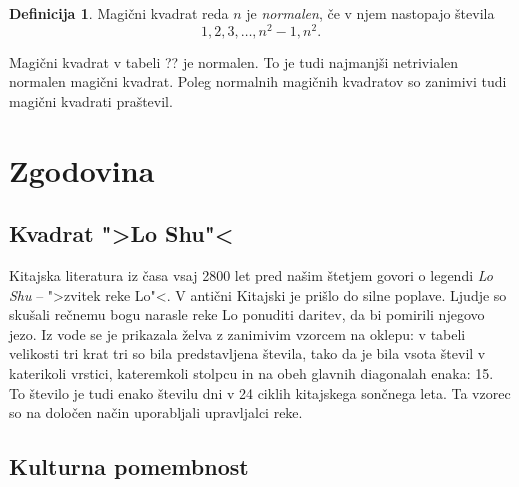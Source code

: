 \documentclass[a4paper,12pt]{article}
\theoremstyle{definition}
\newtheorem{definicija}{Definicija}
\theoremstyle{plain}
\begin{document}




\begin{definicija}
   Magični kvadrat reda \(n\) je \emph{normalen}, če v njem nastopajo števila
   \begin{equation}
      1, 2, 3, \ldots, n^2-1, n^2.
   \end{equation}
   \end{definicija}


Magični kvadrat v tabeli ?? je normalen.
To je tudi najmanjši netrivialen normalen magični kvadrat.
Poleg normalnih magičnih kvadratov so zanimivi tudi magični kvadrati praštevil. %


\section{Zgodovina}

\subsection{Kvadrat ">Lo Shu"<}

Kitajska literatura iz časa vsaj 2800 let pred našim štetjem govori o legendi
\emph{Lo Shu} -- ">zvitek reke Lo"<. V antični Kitajski je prišlo do
silne poplave. Ljudje so skušali rečnemu bogu narasle reke Lo ponuditi daritev,
da bi pomirili njegovo jezo. Iz vode se je prikazala želva z zanimivim vzorcem
na oklepu: v tabeli velikosti tri krat tri so bila predstavljena števila, tako
da je bila vsota števil v katerikoli vrstici, kateremkoli stolpcu in na obeh
glavnih diagonalah enaka: 15. To število je tudi enako številu dni v 24 ciklih
kitajskega sončnega leta. Ta vzorec so na določen način uporabljali upravljalci
reke.


\subsection{Kulturna pomembnost}
\end{document}
